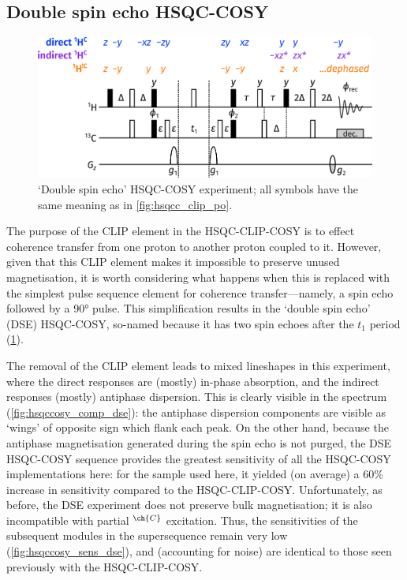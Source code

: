 \documentclass[a4paper,12pt]{article}
\newcommand{\magn}[1]{\ch{^1H}$^{\ch{#1}}$}
\begin{document}
\begin{refsection}
\section{Double spin echo HSQC-COSY}

\begin{figure}[!ht]
    \centering
    \includegraphics[]{dse_po.png}%
    \caption[Double spin echo HSQC-COSY experiment]{
        `Double spin echo' HSQC-COSY experiment; all symbols have the same meaning as in \cref{fig:hsqcc_clip_po}.
    }
    \label{fig:hsqcc_dse_po}
\end{figure}

The purpose of the CLIP element in the HSQC-CLIP-COSY is to effect coherence transfer from one proton to another proton coupled to it.
However, given that this CLIP element makes it impossible to preserve unused magnetisation, it is worth considering what happens when this is replaced with the simplest pulse sequence element for coherence transfer---namely, a spin echo followed by a \ang{90} pulse.
This simplification results in the `double spin echo' (DSE) HSQC-COSY, so-named because it has two spin echoes after the $t_1$ period (\cref{fig:hsqcc_dse_po}).

The removal of the CLIP element leads to mixed lineshapes in this experiment, where the direct responses are (mostly) in-phase absorption, and the indirect responses (mostly) antiphase dispersion.
This is clearly visible in the spectrum (\cref{fig:hsqccosy_comp_dse}): the antiphase dispersion components are visible as `wings' of opposite sign which flank each peak.
On the other hand, because the antiphase magnetisation generated during the spin echo is not purged, the DSE HSQC-COSY sequence provides the greatest sensitivity of all the HSQC-COSY implementations here: for the sample used here, it yielded (on average) a 60\% increase in sensitivity compared to the HSQC-CLIP-COSY.
Unfortunately, as before, the DSE experiment does not preserve bulk magnetisation; it is also incompatible with partial \magn{C} excitation.
Thus, the sensitivities of the subsequent modules in the  supersequence remain very low (\cref{fig:hsqccosy_sens_dse}), and (accounting for noise) are identical to those seen previously with the HSQC-CLIP-COSY.


\end{refsection}
\end{document}
